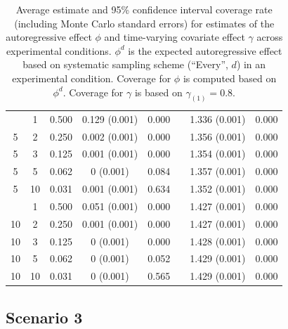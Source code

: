 \documentclass[man]{apa7} %
\begin{document}
\begin{table}[]
\begin{tabular}{cccccccc}
        \addlinespace
        5 & 1 & 0.500 & 0.129 (0.001) & 0.000 & & 1.336 (0.001) & 0.000\\
        5 & 2 & 0.250 & 0.002 (0.001) & 0.000 & & 1.356 (0.001) & 0.000\\
        5 & 3 & 0.125 & 0.001 (0.001) & 0.000 & & 1.354 (0.001) & 0.000\\
        5 & 5 & 0.062 & 0 (0.001) & 0.084 & & 1.357 (0.001) & 0.000\\
        5 & 10 & 0.031 & 0.001 (0.001) & 0.634 & & 1.352 (0.001) & 0.000\\
        \addlinespace
        10 & 1 & 0.500 & 0.051 (0.001) & 0.000 & & 1.427 (0.001) & 0.000\\
        10 & 2 & 0.250 & 0.001 (0.001) & 0.000 & & 1.427 (0.001) & 0.000\\
        10 & 3 & 0.125 & 0 (0.001) & 0.000 & & 1.428 (0.001) & 0.000\\
        10 & 5 & 0.062 & 0 (0.001) & 0.052 & & 1.429 (0.001) & 0.000\\
        10 & 10 & 0.031 & 0 (0.001) & 0.565 & & 1.429 (0.001) & 0.000\\
        \bottomrule
    \end{tabular}
    \caption{Average estimate and 95\% confidence interval coverage rate (including Monte Carlo standard errors) for estimates of the autoregressive effect $\phi$ and time-varying covariate effect $\gamma$ across experimental conditions. $\phi^{d}$ is the expected autoregressive effect based on systematic sampling scheme (``Every'', $d$) in an experimental condition. Coverage for $\phi$ is computed based on $\phi^{d}$. Coverage for $\gamma$ is based on $\gamma_{(1)} = 0.8$.}
    \label{tab:scenario2-appendix}
\end{table}

\subsection{Scenario 3} \label{app:simulation-scenario3}
\end{document}
